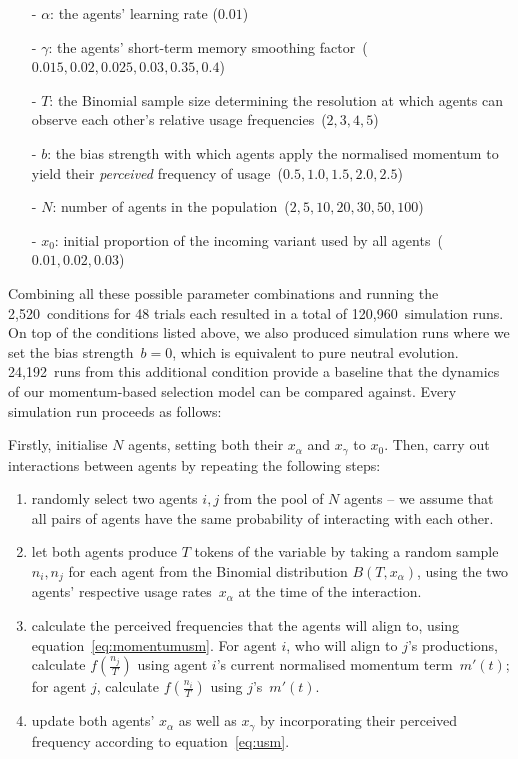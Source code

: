 \begin{itemize}
\item[-] $\alpha$: the agents' learning rate ($0.01$)
\item[-] $\gamma$: the agents' short-term memory smoothing factor~($0.015, 0.02, 0.025, 0.03, 0.35, 0.4$)
\item[-] $T$: the Binomial sample size determining the resolution at which agents can observe each other's relative usage frequencies~($2, 3, 4, 5$)
\item[-] $b$: the bias strength with which agents apply the normalised momentum to yield their \emph{perceived} frequency of usage~($0.5, 1.0, 1.5, 2.0, 2.5$)
\item[-] $N$: number of agents in the population~($2, 5, 10, 20, 30, 50, 100$)
\item[-] $x_0$: initial proportion of the incoming variant used by all agents~($0.01, 0.02, 0.03$)
\end{itemize}

Combining all these possible parameter combinations and running the 2,520~conditions for 48 trials each resulted in a total of 120,960~simulation runs. On top of the conditions listed above, we also produced simulation runs where we set the bias strength~$b=0$, which is equivalent to pure neutral evolution. 24,192~runs from this additional condition provide a baseline that the dynamics of our momentum-based selection model can be compared against. Every simulation run proceeds as follows:

Firstly, initialise $N$ agents, setting both their $x_\alpha$ and $x_\gamma$ to $x_0$. Then, carry out interactions between agents by repeating the following steps:

\begin{enumerate}
\item randomly select two agents $i, j$ from the pool of $N$ agents -- we assume that all pairs of agents have the same probability of interacting with each other.
\item let both agents produce $T$ tokens of the variable by taking a random sample $n_i, n_j$ for each agent from the Binomial distribution $B(T, x_\alpha)$, using the two agents' respective usage rates~$x_\alpha$ at the time of the interaction.
\item calculate the perceived frequencies that the agents will align to, using equation~\ref{eq:momentumusm}. For agent $i$, who will align to $j$'s productions, calculate $f(\frac{n_j}{T})$ using agent $i$'s current normalised momentum term~$m'(t)$; for agent $j$, calculate $f(\frac{n_i}{T})$ using $j$'s~$m'(t)$. %
\item update both agents' $x_\alpha$ as well as $x_\gamma$ by incorporating their perceived frequency according to equation~\ref{eq:usm}.
\end{enumerate}

